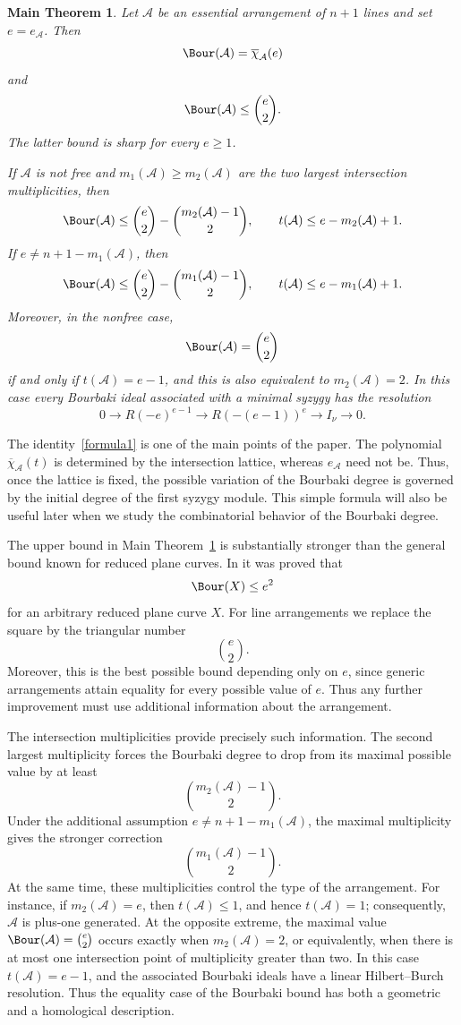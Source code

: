 \documentclass[11pt]{amsart}   %
\newtheorem{mthm}{Main Theorem}
\theoremstyle{definition}
\def\A{{\mathcal A}}
\begin{document}
\begin{mthm}
\label{main:characteristic-bounds}
Let $\A$ be an essential arrangement of $n+1$ lines and set
$e=e_\A$. Then
\begin{equation}\label{formula1}
  \Bour(\A)=\overline{\chi}_\A(e)  
\end{equation}
and
\[
\Bour(\A)\leq\binom e2.
\]
The latter bound is sharp for every $e\geq1$.

If $\A$ is not free and $m_1(\A)\geq m_2(\A)$ are the two largest
intersection multiplicities, then
\[
\Bour(\A)
\leq
\binom e2-\binom{m_2(\A)-1}{2},
\qquad
t(\A)\leq e-m_2(\A)+1.
\]
If $e\neq n+1-m_1(\A)$, then
\[
\Bour(\A)
\leq
\binom e2-\binom{m_1(\A)-1}{2},
\qquad
t(\A)\leq e-m_1(\A)+1.
\]
Moreover, in the nonfree case,
\[
\Bour(\A)=\binom e2
\]
if and only if $t(\A)=e-1$, and this is also equivalent to
$m_2(\A)=2$. In this case every Bourbaki ideal associated with a
minimal syzygy has the resolution
\[
0\longrightarrow R(-e)^{e-1}
\longrightarrow R(-(e-1))^e
\longrightarrow I_\nu
\longrightarrow0.
\]
\end{mthm}

The identity~\eqref{formula1} is one of the main points of the paper. The polynomial
$\overline{\chi}_\A(t)$ is determined by the intersection lattice,
whereas $e_\A$ need not be. Thus, once the lattice is fixed, the
possible variation of the Bourbaki degree is governed by the initial
degree of the first syzygy module. This simple formula will also be
useful later when we study the combinatorial behavior of the Bourbaki
degree.

The upper bound in Main Theorem~\ref{main:characteristic-bounds} is
substantially stronger than the general bound known for reduced plane
curves. In \cite[Theorem~2.10]{JNSBourbaki} it was proved that
\[
\Bour(X)\leq e^2
\]
for an arbitrary reduced plane curve $X$. For line arrangements we
replace the square by the triangular number
\[
\binom e2.
\]
Moreover, this is the best possible bound depending only on $e$, since
generic arrangements attain equality for every possible value of
$e$. Thus any further improvement must use additional information
about the arrangement.

The intersection multiplicities provide precisely such information.
The second largest multiplicity forces the Bourbaki degree to drop
from its maximal possible value by at least
\[
\binom{m_2(\A)-1}{2}.
\]
Under the additional assumption $e\neq n+1-m_1(\A)$, the maximal
multiplicity gives the stronger correction
\[
\binom{m_1(\A)-1}{2}.
\]
At the same time, these multiplicities control the type of the
arrangement. For instance, if $m_2(\A)=e$, then $t(\A)\leq1$, and
hence $t(\A)=1$; consequently, $\A$ is plus-one generated. At the
opposite extreme, the maximal value $\Bour(\A)=\binom e2$ occurs
exactly when $m_2(\A)=2$, or equivalently, when there is at most one
intersection point of multiplicity greater than two. In this case
$t(\A)=e-1$, and the associated Bourbaki ideals have a linear
Hilbert--Burch resolution. Thus the equality case of the Bourbaki
bound has both a geometric and a homological description.
\end{document}
